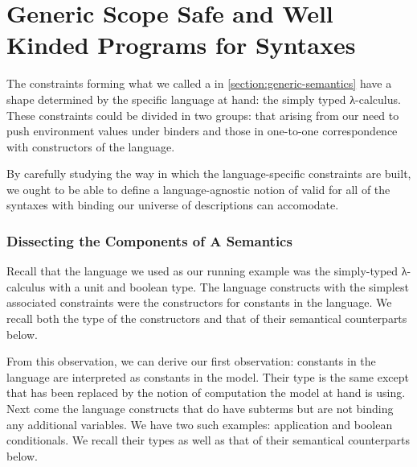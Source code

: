 \chapter{Generic Scope Safe and Well Kinded Programs for Syntaxes}
\label{chapter:generic-semantics}

The constraints forming what we called a  in
\cref{section:generic-semantics} have a shape determined by the
specific language at hand: the simply typed λ-calculus.
%
These constraints could be divided in two groups: that arising
from our need to push environment values under binders and those
in one-to-one correspondence with constructors of the language.

By carefully studying the way in which the language-specific
constraints are built, we ought to be able to define a
language-agnostic notion of  valid for all of
the syntaxes with binding our universe of descriptions can
accomodate.

\subsection{Dissecting the Components of A Semantics}

Recall that the language we used as our running example was the
simply-typed λ-calculus with a unit and boolean type.
%
The language constructs with the simplest associated 
constraints were the constructors for constants in the language. We
recall both the type of the constructors and that of their semantical
counterparts below.

\noindent\begin{minipage}[t]{0.4\textwidth}
\end{minipage}\begin{minipage}[t]{0.6\textwidth}
  \begin{AgdaSuppressSpace}
  \end{AgdaSuppressSpace}
\end{minipage}

From this observation, we can derive our first observation:
constants in the language are interpreted as constants in
the model. Their type is the same except that  has
been replaced by the notion of computation  the model
at hand is using.
%
Next come the language constructs that do have subterms but are not
binding any additional variables. We have two such examples: application
and boolean conditionals. We recall their types as well as that of their
semantical counterparts below.

